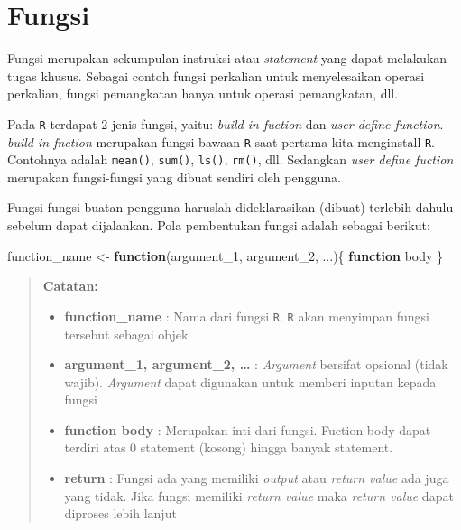\documentclass[
]{book}
\newenvironment{Shaded}{\begin{snugshade}}{\end{snugshade}}
\newcommand{\ControlFlowTok}[1]{\textcolor[rgb]{0.13,0.29,0.53}{\textbf{#1}}}
\newcommand{\NormalTok}[1]{#1}
\newcommand{\OtherTok}[1]{\textcolor[rgb]{0.56,0.35,0.01}{#1}}
\providecommand{\tightlist}{%
  \setlength{\itemsep}{0pt}\setlength{\parskip}{0pt}}
\theoremstyle{definition}
\theoremstyle{definition}
\theoremstyle{definition}
\theoremstyle{definition}
\theoremstyle{remark}
\begin{document}
\hypertarget{fungsi}{%
\section{Fungsi}\label{fungsi}}

Fungsi merupakan sekumpulan instruksi atau \emph{statement} yang dapat melakukan tugas khusus. Sebagai contoh fungsi perkalian untuk menyelesaikan operasi perkalian, fungsi pemangkatan hanya untuk operasi pemangkatan, dll.

Pada \texttt{R} terdapat 2 jenis fungsi, yaitu: \emph{build in fuction} dan \emph{user define function}. \emph{build in fnction} merupakan fungsi bawaan \texttt{R} saat pertama kita menginstall \texttt{R}. Contohnya adalah \texttt{mean()}, \texttt{sum()}, \texttt{ls()}, \texttt{rm()}, dll. Sedangkan \emph{user define fuction} merupakan fungsi-fungsi yang dibuat sendiri oleh pengguna.

Fungsi-fungsi buatan pengguna haruslah dideklarasikan (dibuat) terlebih dahulu sebelum dapat dijalankan. Pola pembentukan fungsi adalah sebagai berikut:

\begin{Shaded}
\begin{Highlighting}[]
\NormalTok{function\_name }\OtherTok{\textless{}{-}} \ControlFlowTok{function}\NormalTok{(argument\_1, argument\_2, ...)\{}
  \ControlFlowTok{function}\NormalTok{ body}
\NormalTok{\}}
\end{Highlighting}
\end{Shaded}

\begin{quote}
\textbf{Catatan:}

\begin{itemize}
\tightlist
\item
  \textbf{function\_name} : Nama dari fungsi \texttt{R}. \texttt{R} akan menyimpan fungsi tersebut sebagai objek
\item
  \textbf{argument\_1, argument\_2, \ldots{}} : \emph{Argument} bersifat opsional (tidak wajib). \emph{Argument} dapat digunakan untuk memberi inputan kepada fungsi
\item
  \textbf{function body} : Merupakan inti dari fungsi. Fuction body dapat terdiri atas 0 statement (kosong) hingga banyak statement.
\item
  \textbf{return} : Fungsi ada yang memiliki \emph{output} atau \emph{return value} ada juga yang tidak. Jika fungsi memiliki \emph{return value} maka \emph{return value} dapat diproses lebih lanjut
\end{itemize}
\end{quote}
\end{document}

